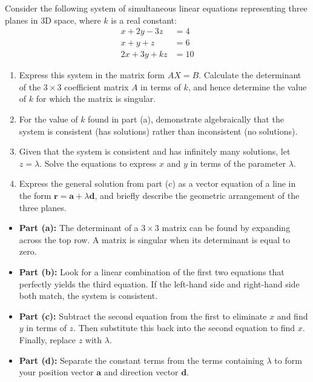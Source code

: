 \begin{problem}
Consider the following system of simultaneous linear equations representing three planes in 3D space, where $k$ is a real constant:
\begin{align*}
x + 2y - 3z &= 4 \\
x + y + z &= 6 \\
2x + 3y + kz &= 10
\end{align*}

\begin{enumerate}[label=\textbf{(\alph*)}]
    \item Express this system in the matrix form $AX = B$. Calculate the determinant of the $3 \times 3$ coefficient matrix $A$ in terms of $k$, and hence determine the value of $k$ for which the matrix is singular.
    \item For the value of $k$ found in part (a), demonstrate algebraically that the system is consistent (has solutions) rather than inconsistent (no solutions).
    \item Given that the system is consistent and has infinitely many solutions, let $z = \lambda$. Solve the equations to express $x$ and $y$ in terms of the parameter $\lambda$.
    \item Express the general solution from part (c) as a vector equation of a line in the form $\mathbf{r} = \mathbf{a} + \lambda\mathbf{d}$, and briefly describe the geometric arrangement of the three planes.
\end{enumerate}
\end{problem}

\begin{hint}
\begin{itemize}
    \item \textbf{Part (a):} The determinant of a $3 \times 3$ matrix can be found by expanding across the top row. A matrix is singular when its determinant is equal to zero.
    \item \textbf{Part (b):} Look for a linear combination of the first two equations that perfectly yields the third equation. If the left-hand side and right-hand side both match, the system is consistent.
    \item \textbf{Part (c):} Subtract the second equation from the first to eliminate $x$ and find $y$ in terms of $z$. Then substitute this back into the second equation to find $x$. Finally, replace $z$ with $\lambda$.
    \item \textbf{Part (d):} Separate the constant terms from the terms containing $\lambda$ to form your position vector $\mathbf{a}$ and direction vector $\mathbf{d}$. 
\end{itemize}
\end{hint}

